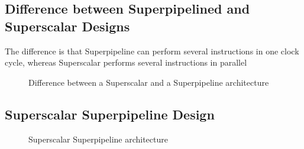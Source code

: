 \documentclass[titlepage, a4paper]{article}
\begin{document}
\subsection{Difference between Superpipelined and Superscalar Designs}
The difference is that Superpipeline can perform several instructions in one clock cycle, whereas Superscalar performs several instructions in parallel

\begin{figure}[H]
  \centering
  \caption{Difference between a Superscalar and a Superpipeline architecture}
  \label{fig:superscalar-vs-superpipeline}
\end{figure}


\subsection{Superscalar Superpipeline Design}

\begin{figure}[H]
  \centering
  \caption{Superscalar Superpipeline architecture}
  \label{fig:superscalar-superpipeline}
\end{figure}
\end{document}
